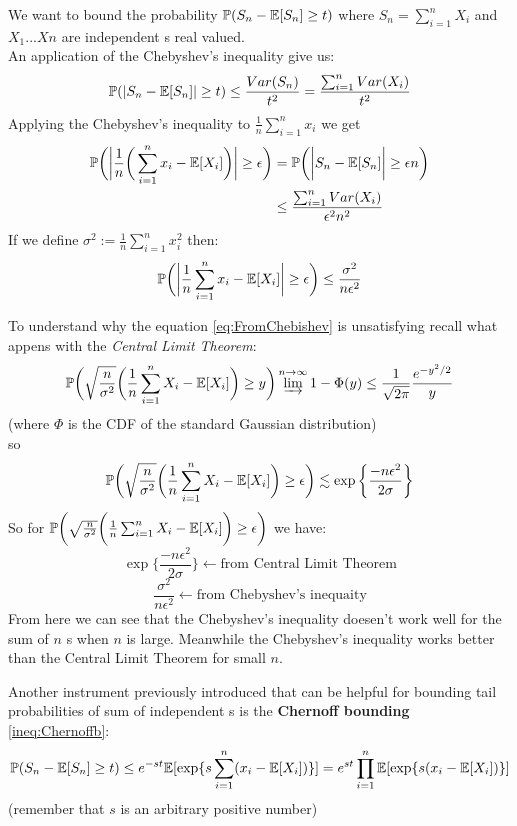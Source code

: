 We want to bound the probability $\mathbb{P}(S_n-\mathbb{E}[S_n]\geq t)$ where $S_n=\sum_{i=1}^{n} X_i$ and $X_1...Xn$ are independent \rv s real valued.\\
An application of the Chebyshev's inequality give us:
$$\mathbb{P}(|S_n-\mathbb{E}[S_n]|\geq t)\leq \frac{Var(S_n)}{t^2}=\frac{\sum_{i=1}^{n}Var(X_i)}{t^2}$$
Applying the Chebyshev's inequality to $ \frac{1}{n} \sum_{i=1}^{n}x_i$ we get
\[
\begin{split}
\mathbb{P}\bigg( \bigg| \frac{1}{n} \bigg( \sum_{i=1}^{n}x_i - \mathbb{E} [X_i] \bigg) \bigg| \geq \epsilon \bigg)
&=\mathbb{P}\bigg( \bigg| S_n - \mathbb{E} [S_n] \bigg| \geq \epsilon n \bigg)\\
&\leq \frac{\sum_{i=1}^{n}Var(X_i)}{\epsilon^2 n^2}
\end{split}
\]
If we define $\sigma^2 :=\frac{1}{n}\sum_{i=1}^{n}x_i^2$ then:
\begin{equation} \label{eq:FromChebishev}
	\mathbb{P}\bigg( \bigg| \frac{1}{n} \sum_{i=1}^{n}x_i - \mathbb{E} [X_i] \bigg| \geq \epsilon \bigg)\leq \frac{\sigma^2}{n\epsilon^2}
\end{equation}
\begin{oss}
To understand why the equation \ref{eq:FromChebishev} is unsatisfying recall what appens with the \textit{Central Limit Theorem}:
$$\mathbb{P}\bigg(\sqrt{\frac{n}{\sigma^2}}\bigg( \frac{1}{n}\sum_{i=1}^{n} X_i -\mathbb{E}[X_i] \bigg) \geq y \bigg) \varinjlim^{n\to \infty} 1- \Phi(y)\leq \frac{1}{\sqrt{2\pi}}\frac{e^{-y^2/2}}{y}$$
(where $\Phi$ is the CDF of the standard Gaussian distribution)\\
so
$$\mathbb{P}\bigg(\sqrt{\frac{n}{\sigma^2}}\bigg( \frac{1}{n}\sum_{i=1}^{n} X_i -\mathbb{E}[X_i] \bigg) \geq \epsilon  \bigg)\lesssim \exp\bigg\{ \frac{-n\epsilon^2}{2\sigma} \bigg\}$$
So for $\mathbb{P}\bigg(\sqrt{\frac{n}{\sigma^2}}\bigg( \frac{1}{n}\sum_{i=1}^{n} X_i -\mathbb{E}[X_i] \bigg) \geq \epsilon \bigg)$ we have:
$$\exp\bigg\{ \frac{-n\epsilon^2}{2\sigma} \bigg\}\leftarrow \text{from Central Limit Theorem}$$
$$\frac{\sigma^2}{n\epsilon^2}\leftarrow \text{from Chebyshev's inequaity}$$
From here we can see that the Chebyshev's inequality doesen't work well for the sum of $n$ \rv s when $n$ is large. Meanwhile the Chebyshev's inequality works better than the Central Limit Theorem for small $n$.
\end{oss}

Another instrument previously introduced that can be helpful for bounding tail probabilities of sum of independent \rv s is the \textbf{Chernoff bounding} \ref{ineq:Chernoffb}:
\begin{equation}
\label{eq:ChernoffSum}
\mathbb{P}(S_n-\mathbb{E}[S_n]\geq t)\leq e^{-st}\mathbb{E}[\exp \{ s \sum_{i=1}^{n} (x_i-\mathbb{E}[X_i]) \}]=e^{st} \prod_{i=1}^{n}\mathbb{E}[\exp \{ s(x_i-\mathbb{E}[X_i]) \}]	
\end{equation}
(remember that $s$ is an arbitrary positive number)

